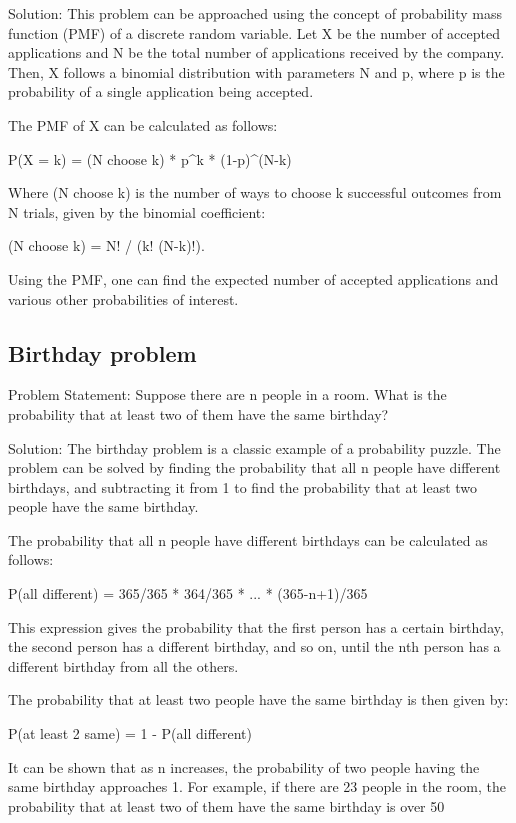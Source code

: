 \documentclass[12pt, a4paper, oneside]{article}
\begin{document}
Solution:
This problem can be approached using the concept of probability mass function (PMF) of a discrete random variable. Let X be the number of accepted applications and N be the total number of applications received by the company. Then, X follows a binomial distribution with parameters N and p, where p is the probability of a single application being accepted.

The PMF of X can be calculated as follows:

P(X = k) = (N choose k) * p^k * (1-p)^(N-k)

Where (N choose k) is the number of ways to choose k successful outcomes from N trials, given by the binomial coefficient:

(N choose k) = N! / (k! (N-k)!).

Using the PMF, one can find the expected number of accepted applications and various other probabilities of interest.

\subsection{ Birthday problem }
Problem Statement:
Suppose there are n people in a room. What is the probability that at least two of them have the same birthday?

Solution:
The birthday problem is a classic example of a probability puzzle. The problem can be solved by finding the probability that all n people have different birthdays, and subtracting it from 1 to find the probability that at least two people have the same birthday.

The probability that all n people have different birthdays can be calculated as follows:

P(all different) = 365/365 * 364/365 * ... * (365-n+1)/365

This expression gives the probability that the first person has a certain birthday, the second person has a different birthday, and so on, until the nth person has a different birthday from all the others.

The probability that at least two people have the same birthday is then given by:

P(at least 2 same) = 1 - P(all different)

It can be shown that as n increases, the probability of two people having the same birthday approaches 1. For example, if there are 23 people in the room, the probability that at least two of them have the same birthday is over 50%
\end{document}
